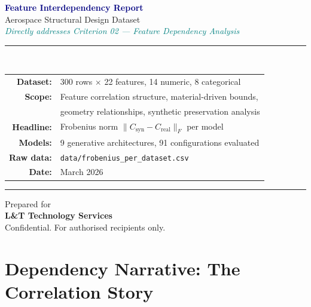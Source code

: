 \documentclass[11pt, a4paper]{report}
\begin{document}
\begin{titlepage}
\begin{center}
\vspace*{2cm}
{\Huge\bfseries\textcolor{navy}{Feature Interdependency Report}}\\[0.8cm]
{\Large\textcolor{slate}{Aerospace Structural Design Dataset}}\\[0.4cm]
{\large\textcolor{teal}{\textit{Directly addresses Criterion 02 --- Feature Dependency Analysis}}}

\vspace{1.5cm}
\rule{0.65\textwidth}{1.5pt}\\[0.5cm]
{\large
\begin{tabular}{rl}
\textbf{Dataset:}       & 300 rows $\times$ 22 features, 14 numeric, 8 categorical \\[4pt]
\textbf{Scope:}         & Feature correlation structure, material-driven bounds, \\
                        & geometry relationships, synthetic preservation analysis \\[4pt]
\textbf{Headline:}      & Frobenius norm $\lVert C_{\text{syn}} - C_{\text{real}} \rVert_F$ per model \\[4pt]
\textbf{Models:}        & 9 generative architectures, 91 configurations evaluated \\[4pt]
\textbf{Raw data:}      & \texttt{data/frobenius\_per\_dataset.csv} \\[4pt]
\textbf{Date:}          & March 2026 \\
\end{tabular}}
\vspace{1.5cm}
\rule{0.65\textwidth}{1.5pt}
\vspace{2cm}
{\large Prepared for}\\[0.3cm]
{\Large\bfseries L\&T Technology Services}\\[1cm]
{\footnotesize\textcolor{slate}{Confidential. For authorised recipients only.}}
\end{center}
\end{titlepage}

\tableofcontents
\newpage

\chapter{Dependency Narrative: The Correlation Story}
\end{document}
